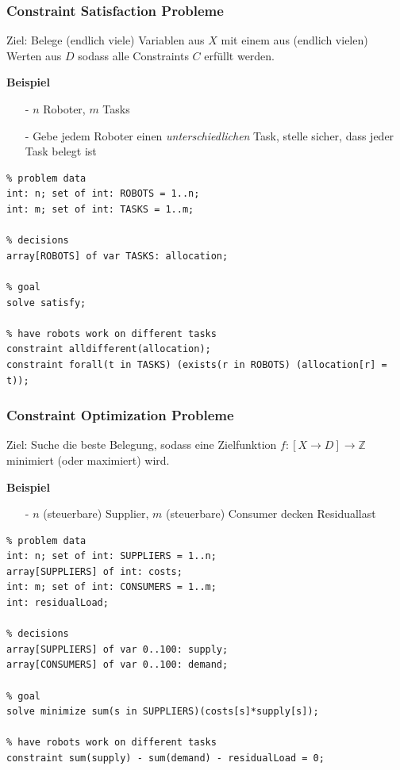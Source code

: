 \begin{frame}[fragile]
\frametitle{Constraint Satisfaction Probleme}

\vspace*{5ex}

\alert{Ziel:} Belege (endlich viele) Variablen aus $X$ mit einem aus (endlich vielen) Werten aus $D$ sodass alle Constraints $C$ erfüllt werden.

\vspace*{1ex}

\textbf{Beispiel}
\begin{itemize}
\item [-] $n$ Roboter, $m$ Tasks
\item [-] Gebe jedem Roboter einen \emph{unterschiedlichen} Task, stelle sicher, dass jeder Task belegt ist 
\end{itemize}

\begin{lstlisting}
% problem data 
int: n; set of int: ROBOTS = 1..n;
int: m; set of int: TASKS = 1..m;

% decisions
array[ROBOTS] of var TASKS: allocation;

% goal
solve satisfy;

% have robots work on different tasks
constraint alldifferent(allocation);
constraint forall(t in TASKS) (exists(r in ROBOTS) (allocation[r] = t));
\end{lstlisting}
\end{frame}

\begin{frame}[fragile]
\frametitle{Constraint Optimization Probleme}

\vspace*{4ex}

\alert{Ziel:} Suche die beste Belegung, sodass eine Zielfunktion $f : [X \to D] \to \mathbb{Z}$ minimiert (oder maximiert) wird.

\vspace*{1ex}

\textbf{Beispiel}
\begin{itemize}
\item [-] $n$ (steuerbare) Supplier, $m$ (steuerbare) Consumer decken Residuallast
\end{itemize}

\begin{lstlisting}
% problem data 
int: n; set of int: SUPPLIERS = 1..n;
array[SUPPLIERS] of int: costs;
int: m; set of int: CONSUMERS = 1..m;
int: residualLoad;

% decisions
array[SUPPLIERS] of var 0..100: supply;
array[CONSUMERS] of var 0..100: demand;

% goal
solve minimize sum(s in SUPPLIERS)(costs[s]*supply[s]);

% have robots work on different tasks
constraint sum(supply) - sum(demand) - residualLoad = 0; 
\end{lstlisting}
\end{frame}

